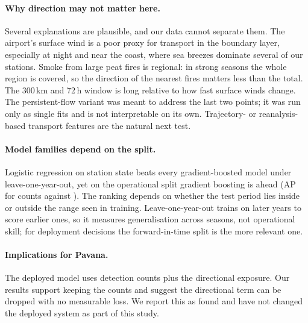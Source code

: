 \paragraph{Why direction may not matter here.}
Several explanations are plausible, and our data cannot separate them. The airport's surface wind
is a poor proxy for transport in the boundary layer, especially at night and near the coast,
where sea breezes dominate several of our stations. Smoke from large peat fires is regional: in
strong seasons the whole region is covered, so the direction of the nearest fires matters less
than the total. The 300\,km and 72\,h window is long relative to how fast surface winds change.
The persistent-flow variant was meant to address the last two points; it was run only as single
fits and is not interpretable on its own. Trajectory- or reanalysis-based transport features are
the natural next test.

\paragraph{Model families depend on the split.}
Logistic regression on station state beats every gradient-boosted model under leave-one-year-out,
yet on the operational split gradient boosting is ahead (AP  for counts against
). The ranking depends on whether the test period lies inside or outside the
range seen in training. Leave-one-year-out trains on later years to score earlier ones, so it
measures generalisation across seasons, not operational skill; for deployment decisions the
forward-in-time split is the more relevant one.

\paragraph{Implications for Pavana.}
The deployed model uses detection counts plus the directional exposure. Our results support
keeping the counts and suggest the directional term can be dropped with no measurable loss. We
report this as found and have not changed the deployed system as part of this study.

